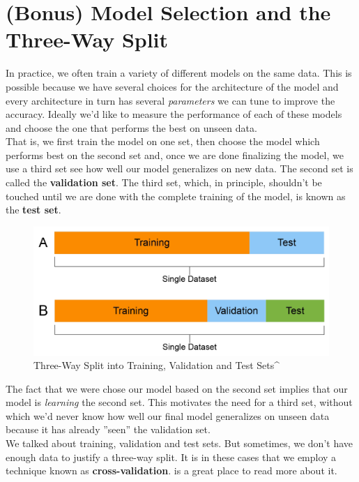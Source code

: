 \documentclass[12pt]{article}
\begin{document}
\section{(Bonus) Model Selection and the Three-Way Split}
\noindent
In practice, we often train a variety of different models on the same data. This is possible because we have several choices for the architecture of the model and every architecture in turn has several \textit{parameters} we can tune to improve the accuracy. Ideally we'd like to measure the performance of each of these models and choose the one that performs the best on unseen data. 
\\

\noindent That is, we first train the model on one set, then choose the model which performs best on the second set and, once we are done finalizing the model, we use a third set see how well our model generalizes on new data. The second set is called the \textbf{validation set}. The third set, which, in principle, shouldn't be touched until we are done with the complete training of the model, is known as the \textbf{test set}. 
\\
\begin{figure}[h]

\centering
\includegraphics[scale=0.3]{validation.png}
\caption{Three-Way Split into Training, Validation and Test Sets^\cite{twowaysplit}}
\end{figure}


\noindent The fact that we were chose our model based on the second set implies that our model is \textit{learning} the second set. This motivates the need for a third set, without which we'd never know how well our final model generalizes on unseen data because it has already ''seen'' the validation set. 
\\

\noindent We talked about training, validation and test sets. But sometimes, we don't have enough data to justify a three-way split. It is in these cases that we employ a technique known as \textbf{cross-validation}.  \cite{crossvalidation} is a great place to read more about it.
\end{document}

